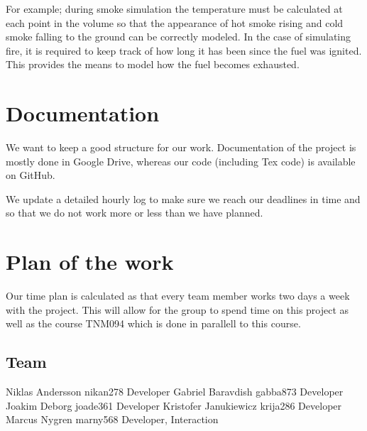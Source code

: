 \documentclass[a4paper,12pt,twoside,swedish]{report}
\begin{document}
For example; during smoke simulation the temperature must be calculated at each point in the volume so that the appearance of hot smoke rising and cold smoke falling to the ground can be correctly modeled. In the case of simulating fire, it is required to keep track of how long it has been since the fuel was ignited. This provides the means to model how the fuel becomes exhausted.

\section{Documentation}
We want to keep a good structure for our work. Documentation of the project is mostly done in Google Drive, whereas our code (including Tex code) is available on GitHub.

We update a detailed hourly log to make sure we reach our deadlines in time and so that we do not work more or less than we have planned.

\section{Plan of the work}
Our time plan is calculated as that every team member works two days a week with the project. This will allow for the group to spend time on this project as well as the course TNM094 which is done in parallell to this course.

 \subsection{Team}
Niklas Andersson	nikan278	Developer
Gabriel Baravdish	gabba873	Developer
Joakim Deborg	joade361	Developer
Kristofer Janukiewicz	krija286	Developer
Marcus Nygren	marny568	Developer, Interaction
\end{document}
